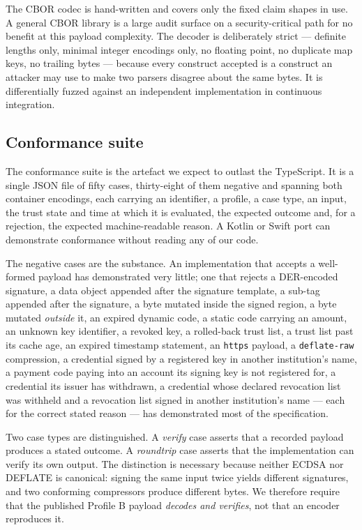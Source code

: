 \documentclass[10pt,a4paper,twocolumn]{article}
\newcommand{\code}[1]{\texttt{\small #1}}
\begin{document}
The CBOR codec is hand-written and covers only the fixed claim shapes in use. A
general CBOR library is a large audit surface on a security-critical path for no
benefit at this payload complexity. The decoder is deliberately strict ---
definite lengths only, minimal integer encodings only, no floating point, no
duplicate map keys, no trailing bytes --- because every construct accepted is a
construct an attacker may use to make two parsers disagree about the same bytes.
It is differentially fuzzed against an independent implementation in continuous
integration.

\subsection{Conformance suite}

The conformance suite is the artefact we expect to outlast the TypeScript. It is
a single JSON file of fifty cases, thirty-eight of them negative and
spanning both container encodings, each carrying an
identifier, a profile, a case type, an input, the trust state and time at which
it is evaluated, the expected outcome and, for a rejection, the expected
machine-readable reason. A Kotlin or Swift port can demonstrate conformance
without reading any of our code.

The negative cases are the substance. An implementation that accepts a
well-formed payload has demonstrated very little; one that rejects a
DER-encoded signature, a data object appended after the signature template, a
sub-tag appended after the signature, a byte mutated inside the signed region, a
byte mutated \emph{outside} it, an expired dynamic code, a static code carrying
an amount, an unknown key identifier, a revoked key, a rolled-back trust list, a
trust list past its cache age, an expired timestamp statement, an
\code{https} payload, a \code{deflate-raw} compression, a credential signed
by a registered key in another institution's name, a payment code paying
into an account its signing key is not registered for, a credential its
issuer has withdrawn, a credential whose declared revocation list was withheld
and a revocation list signed in another institution's name --- each for the
correct stated reason --- has demonstrated most of the specification.

Two case types are distinguished. A \emph{verify} case asserts that a recorded
payload produces a stated outcome. A \emph{roundtrip} case asserts that the
implementation can verify its own output. The distinction is necessary because
neither ECDSA nor DEFLATE is canonical: signing the same input twice yields
different signatures, and two conforming compressors produce different bytes. We
therefore require that the published Profile B payload \emph{decodes and
verifies}, not that an encoder reproduces it.
\end{document}
